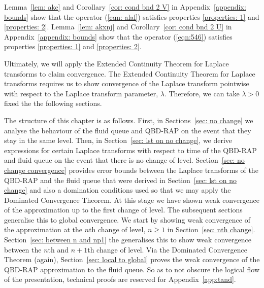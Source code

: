 Lemma~\ref{lem: akc} and Corollary~\ref{cor: cond bnd 2 V} in Appendix~\ref{appendix: bounds} show that the operator (\ref{eqn: alal}) satisfies properties \ref{properties: 1} and \ref{properties: 2}. Lemma~\ref{lem: akxnj} and Corollary~\ref{cor: cond bnd 2 U} in Appendix~\ref{appendix: bounds} show that the operator (\ref{eqn:546}) satisfies properties \ref{properties: 1} and \ref{properties: 2}. 

Ultimately, we will apply the Extended Continuity Theorem for Laplace transforms \cite[Chapter XIII, Theorem 2a]{feller1957} to claim convergence. The Extended Continuity Theorem for Laplace transforms requires us to show convergence of the Laplace transform pointwise with respect to the Laplace transform parameter, \(\lambda\). Therefore, we can take \(\lambda>0\) fixed the the following sections. 

The structure of this chapter is as follows. First, in Sections~\ref{sec: no change} we analyse the behaviour of the fluid queue and QBD-RAP on the event that they stay in the same level. Then, in Section~\ref{sec: lst on no change}, we derive expressions for certain Laplace transforms with respect to time of the QBD-RAP and fluid queue on the event that there is no change of level. Section~\ref{sec: no change convergence} provides error bounds between the Laplace transforms of the QBD-RAP and the fluid queue that were derived in Section~\ref{sec: lst on no change} and also a domination conditions used so that we may apply the Dominated Convergence Theorem. At this stage we have shown weak convergence of the approximation up to the first change of level. The subsequent sections generalise this to global convergence. We start by showing weak convergence of the approximation at the \(n\)th change of level, \(n\geq 1\) in Section~\ref{sec: nth change}. Section~\ref{sec: between n and np1} the generalises this to show weak convergence between the \(n\)th and \(n+1\)th change of level. Via the Dominated Convergence Theorem (again), Section~\ref{sec: local to global} proves the weak convergence of the QBD-RAP approximation to the fluid queue. So as to not obscure the logical flow of the presentation, technical proofs are reserved for Appendix~\ref{app:tand}.

